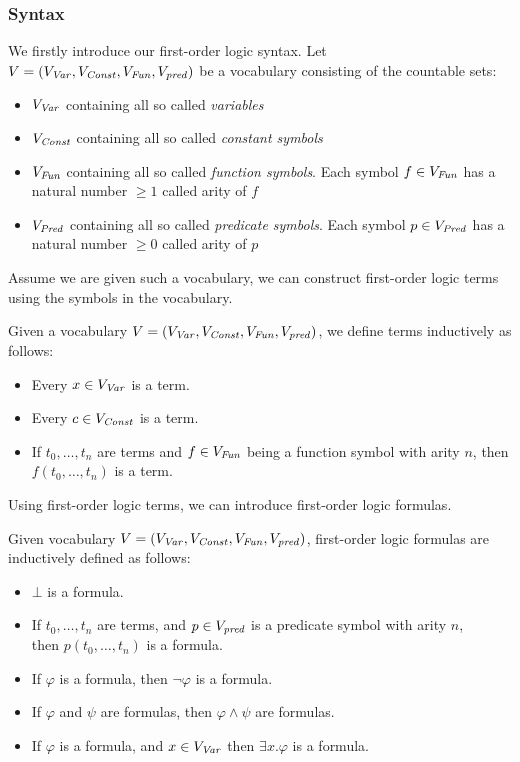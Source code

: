 \subsubsection{Syntax}
We firstly introduce our first-order logic syntax.
Let $V = (V_{\mathit{Var}}, V_{\mathit{Const}}, V_{\mathit{Fun}}, V_{\mathit{pred}})$ be a vocabulary consisting of the countable sets:
\begin{itemize}
	\item $V_{\mathit{Var}}$ containing all so called \textsl{variables}
	\item $V_{\mathit{Const}}$ containing all so called \textsl{constant symbols}
	\item $V_{\mathit{Fun}} $ containing all so called \textsl{function symbols}. Each symbol $f \in V_{\mathit{Fun}}$ has a natural number $\geq 1$ called arity of $f$
 	\item $V_{\mathit{Pred}}$ containing all so called \textsl{predicate symbols}. Each symbol $p \in V_{\mathit{Pred}}$ has a natural number $\geq 0$ called arity of $p$
\end{itemize}
Assume we are given such a vocabulary, we can construct first-order logic terms using the symbols in the vocabulary.
\begin{mydef}[Term] 
	Given a vocabulary $V = (V_{\mathit{Var}}, V_{\mathit{Const}}, V_{\mathit{Fun}}, V_{\mathit{pred}})$, we define terms inductively as follows:
	\begin{itemize}
		\item Every $x \in V_{\mathit{Var}}$ is a term.
		\item Every $c \in V_{\mathit{Const}}$ is a term.
		\item If $t_0, \ldots, t_n$ are terms and $f \in V_{\mathit{Fun}}$ being a function symbol with arity $n$, then $f(t_0, \ldots, t_n)$ is a term.
	\end{itemize}
\end{mydef}
Using first-order logic terms, we can introduce first-order logic formulas.
\begin{mydef}[Formula]
	Given vocabulary $V = (V_{\mathit{Var}}, V_{\mathit{Const}}, V_{\mathit{Fun}}, V_{\mathit{pred}})$, first-order logic formulas are inductively defined as follows:
	\begin{itemize}
		\item $\bot$ is a formula.
		\item If  $t_0, \ldots, t_n$ are terms, and $p \in V_{\mathit{pred}}$ is a predicate symbol with arity $n$, \\ then $p(t_0, \ldots, t_n)$ is a formula.
		\item If $\varphi$ is a formula, then $\neg \varphi$ is a formula.
		\item If $\varphi$ and $\psi$ are formulas, then $\varphi \land \psi$ are formulas.
		\item If $\varphi$ is a formula, and $x \in V_{\mathit{Var}}$ then $\exists x. \varphi$ is a formula.
	\end{itemize}
\end{mydef}
